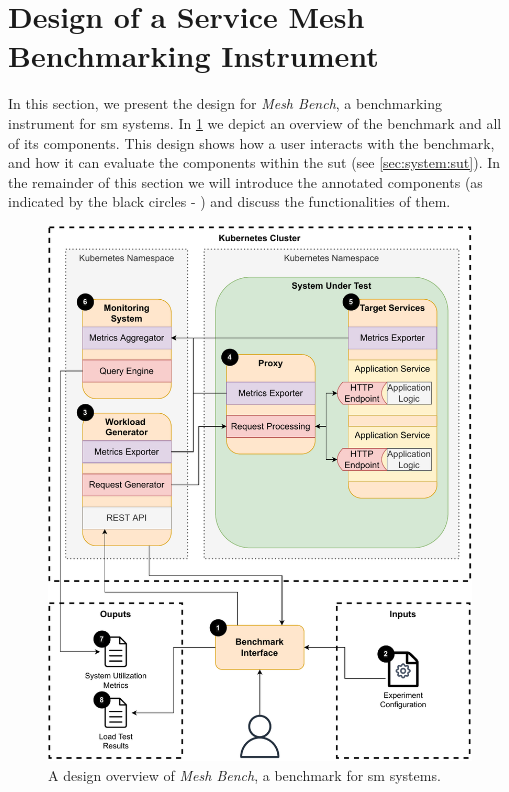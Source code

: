 \section{Design of a Service Mesh Benchmarking Instrument}
\label{sec:system:design}

In this section, we present the design for \textit{Mesh Bench}, a benchmarking instrument for \gls{sm} systems. In \cref{fig:benchmark-design} we depict an overview of the benchmark and all of its components. This design shows how a user interacts with the benchmark, and how it can evaluate the components within the \gls{sut} (see \cref{sec:system:sut}). In the remainder of this section we will introduce the annotated components (as indicated by the black circles  - ) and discuss the functionalities of them.

\begin{figure}[!t]
    \centering
     
    \includegraphics[width=0.9\linewidth]{4_system_design/figures/detailed-benchmark-design.pdf}
    
    \caption[Design of \textit{Mesh Bench}.]{A design overview of \textit{Mesh Bench}, a benchmark for \gls{sm} systems.}
    
    \label{fig:benchmark-design}
\end{figure}



